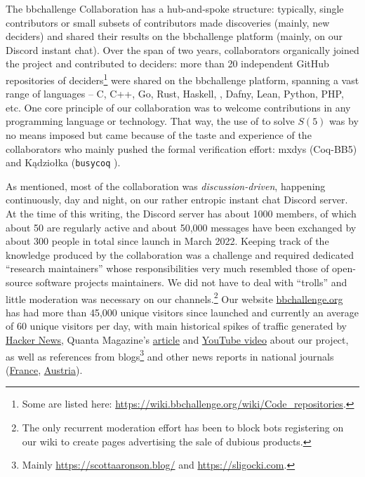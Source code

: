 \documentclass[a4paper,british]{article}
\theoremstyle{definition} %
\numberwithin{equation}{section}
\theoremstyle{definition} %
\newcommand{\CoqBB}{Coq-BB5\xspace}
\begin{document}
The bbchallenge Collaboration has a hub-and-spoke structure: typically, single contributors or small subsets of contributors made discoveries (mainly, new deciders) and shared their results on the bbchallenge platform (mainly, on our Discord instant chat). Over the span of two years, collaborators organically joined the project and contributed to deciders: more than 20 independent GitHub repositories of deciders\footnote{Some are listed here: \url{https://wiki.bbchallenge.org/wiki/Code_repositories}.} were shared on the bbchallenge platform, spanning a vast range of languages -- C, C++, Go, Rust, Haskell, \Coq, Dafny, Lean, Python, PHP, etc. One core principle of our collaboration was to welcome contributions in any programming language or technology. That way, the use of \Coq to solve $S(5)$ was by no means imposed but came because of the taste and experience of the collaborators who mainly pushed the formal verification effort: mxdys (\CoqBB) and Kądziołka (\texttt{busycoq} \cite{busycoq}).


As mentioned, most of the collaboration was \textit{discussion-driven}, happening continuously, day and night, on our rather entropic instant chat Discord server. At the time of this writing, the Discord server has about 1000 members, of which about 50 are regularly active and about 50,000 messages have been exchanged by about 300 people in total since launch in March 2022. Keeping track of the knowledge produced by the collaboration was a challenge and required dedicated ``research maintainers'' whose responsibilities very much resembled those of open-source software projects maintainers. We did not have to deal with ``trolls'' and little moderation was necessary on our channels.\footnote{The only recurrent moderation effort has been to block bots registering on our wiki to create pages advertising the sale of dubious products.} Our website \href{https://bbchallenge.or}{bbchallenge.org} has had more than 45,000 unique visitors since launched and currently an average of 60 unique visitors per day, with main historical spikes of traffic generated by \href{https://news.ycombinator.com/item?id=34689081}{Hacker News},  Quanta Magazine's \href{https://www.quantamagazine.org/amateur-mathematicians-find-fifth-busy-beaver-turing-machine-20240702/}{article} and \href{https://www.youtube.com/watch?v=rmx3FBPzDuk}{YouTube video} about our project, as well as references from blogs\footnote{Mainly \url{https://scottaaronson.blog/} and \url{https://sligocki.com}.} and other news reports in national journals (\href{https://www.lemonde.fr/sciences/article/2024/07/17/mathematiques-le-defi-du-castor-affaire-resolu_6251337_1650684.html}{France}, \href{https://www.derstandard.de/story/3000000249211/durchbruch-beim-mathematischen-problem-des-fleissigen-bibers}{Austria}).
\end{document}

